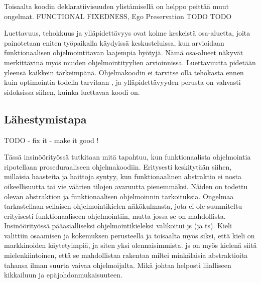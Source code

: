 Toisaalta koodin deklaratiivisuuden ylistämisellä on helppo peittää muut ongelmat. FUNCTIONAL FIXEDNESS, Ego Preservation TODO TODO

Luettavuus, tehokkuus ja ylläpidettävyys ovat kolme keskeistä osa-aluetta, joita painotetaan eniten työpaikalla käydyissä keskusteluissa, kun arvioidaan funktionaalisen ohjelmointitavan laajempia hyötyjä. Nämä osa-alueet näkyvät merkittävinä myös muiden ohjelmointityylien arvioinnissa. Luettavuutta pidetään yleensä kaikkein tärkeimpänä. Ohjelmakoodin ei tarvitse olla tehokasta ennen kuin optimointia todella tarvitaan \cite{prematureoptimization}, ja ylläpidettävyyden perusta on vahvasti sidoksissa siihen, kuinka luettavaa koodi on.


\subsection{Lähestymistapa}

TODO - fix it - make it good !

Tässä insinöörityössä tutkitaan mitä tapahtuu, kun funktionaalista ohjelmointia ripotellaan proseduraaliseen ohjelmakoodiin. Eritysesti keskitytään siihen, millaisia haasteita ja haittoja syntyy, kun funktionaalinen abstraktio ei nosta oikeellisuutta tai vie väärien tilojen avaruutta pienemmäksi. Näiden on todettu olevan abstraktion ja funktionaalisen ohjelmoinnin tarkoituksia. \cite{dijkstra_humble_programmer,impossiblebetter} Ongelmaa tarkastellaan sellaisen ohjelmointikielen näkökulmasta, jota ei ole suunniteltu erityisesti funktionaaliseen ohjelmointiin, mutta jossa se on mahdollista. Insinöörityössä pääasialliseksi ohjelmointikieleksi valikoitui \acrfull{js} (ja \acrfull{ts}). Kieli valittiin osaamisen ja kokemuksen perusteella ja toisaalta myös siksi, että kieli on markkinoiden käytetyimpiä, ja siten yksi olennaisimmista. \cite{pypl:lang} \Gls{js} on myös kielenä siitä mielenkiintoinen, että se mahdollistaa rakentaa miltei minkälaisia abstraktioita tahansa ilman suurta vaivaa ohjelmoijalta. Mikä johtaa helposti liialliseen kikkailuun ja epäjohdonmukaisuuteen.

